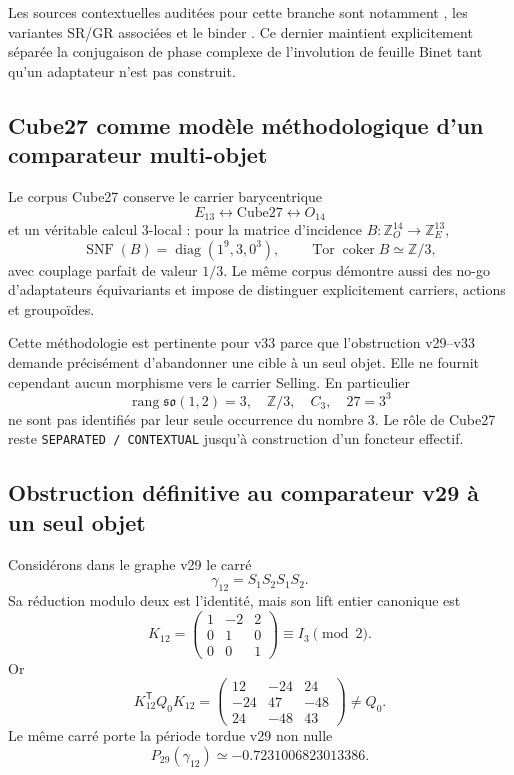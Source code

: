 \documentclass[11pt,a4paper]{article}
\begin{document}
Les sources contextuelles auditées pour cette branche sont notamment
, les variantes SR/GR associées et le binder
. Ce dernier maintient explicitement séparée
la conjugaison de phase complexe de l'involution de feuille Binet tant qu'un adaptateur n'est pas
construit.

\subsection{Cube27 comme modèle méthodologique d'un comparateur multi-objet}

Le corpus Cube27 conserve le carrier barycentrique
\[
 E_{13}\longleftrightarrow\mathrm{Cube27}\longleftrightarrow O_{14}
\]
et un véritable calcul $3$-local : pour la matrice d'incidence
$B:\mathbb Z_O^{14}\to\mathbb Z_E^{13}$,
\[
 \operatorname{SNF}(B)=\operatorname{diag}(1^9,3,0^3),
 \qquad
 \operatorname{Tor}\operatorname{coker}B\simeq\mathbb Z/3,
\]
avec couplage parfait de valeur $1/3$. Le même corpus démontre aussi des no-go d'adaptateurs
équivariants et impose de distinguer explicitement carriers, actions et groupoïdes.

Cette méthodologie est pertinente pour v33 parce que l'obstruction v29--v33 demande précisément
d'abandonner une cible à un seul objet. Elle ne fournit cependant aucun morphisme vers le carrier
Selling. En particulier
\[
 \boxed{
 \operatorname{rang}\mathfrak{so}(1,2)=3,
 \quad \mathbb Z/3,
 \quad C_3,
 \quad 27=3^3
 }
\]
ne sont pas identifiés par leur seule occurrence du nombre $3$. Le rôle de Cube27 reste
\texttt{SEPARATED / CONTEXTUAL} jusqu'à construction d'un foncteur effectif.

\subsection{Obstruction définitive au comparateur v29 à un seul objet}

Considérons dans le graphe v29 le carré
\[
 \gamma_{12}=S_1S_2S_1S_2.
\]
Sa réduction modulo deux est l'identité, mais son lift entier canonique est
\begin{equation}\label{eq:v33-v29-square-lift}
 \boxed{
 K_{12}=
 \begin{pmatrix}
 1&-2&2\\0&1&0\\0&0&1
 \end{pmatrix}
 \equiv I_3\pmod2.}
\end{equation}
Or
\begin{equation}\label{eq:v33-v29-square-form}
 K_{12}^{\mathsf T}Q_0K_{12}
 =
 \begin{pmatrix}
 12&-24&24\\
 -24&47&-48\\
 24&-48&43
 \end{pmatrix}
 \neq Q_0.
\end{equation}
Le même carré porte la période tordue v29 non nulle
\[
 P_{29}(\gamma_{12})\simeq-0.7231006823013386.
\]
\end{document}
